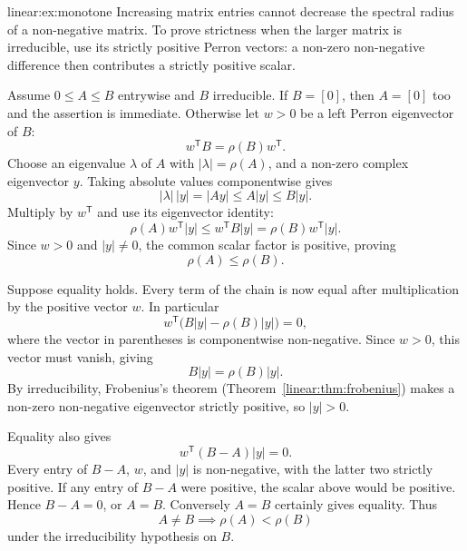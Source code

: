 \begin{solution}{linear:ex:monotone}
\idea Increasing matrix entries cannot decrease the spectral radius of a non-negative matrix. To prove strictness when the larger matrix is irreducible, use its strictly positive Perron vectors: a non-zero non-negative difference then contributes a strictly positive scalar.

\writeup Assume $0\le A\le B$ entrywise and $B$ irreducible.
If $B=[0]$, then $A=[0]$ too and the assertion is immediate.
Otherwise let $w>0$ be a left Perron eigenvector of $B$:
\[
w^{\mathsf T}B=\rho(B)w^{\mathsf T}.
\]
Choose an eigenvalue $\lambda$ of $A$ with $|\lambda|=\rho(A)$, and a non-zero complex eigenvector $y$. Taking absolute values componentwise gives
\[
|\lambda|\,|y|=|Ay|\le A|y|\le B|y|.
\]
Multiply by $w^{\mathsf T}$ and use its eigenvector identity:
\[
\rho(A)w^{\mathsf T}|y|
\le w^{\mathsf T}B|y|
=\rho(B)w^{\mathsf T}|y|.
\]
Since $w>0$ and $|y|\ne0$, the common scalar factor is positive, proving
\[
\boxed{\rho(A)\le\rho(B)}.
\]

Suppose equality holds. Every term of the chain is now equal after multiplication by the positive vector $w$. In particular
\[
w^{\mathsf T}\bigl(B|y|-\rho(B)|y|\bigr)=0,
\]
where the vector in parentheses is componentwise non-negative. Since $w>0$, this vector must vanish, giving
\[
B|y|=\rho(B)|y|.
\]
By irreducibility, Frobenius's theorem (Theorem~\ref{linear:thm:frobenius}) makes a non-zero non-negative eigenvector strictly positive, so $|y|>0$.

Equality also gives
\[
w^{\mathsf T}(B-A)|y|=0.
\]
Every entry of $B-A$, $w$, and $|y|$ is non-negative, with the latter two strictly positive. If any entry of $B-A$ were positive, the scalar above would be positive. Hence $B-A=0$, or $A=B$. Conversely $A=B$ certainly gives equality. Thus
\[
\boxed{A\ne B\implies\rho(A)<\rho(B)}
\]
under the irreducibility hypothesis on $B$.
\end{solution}

